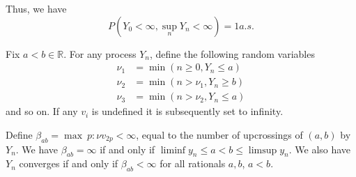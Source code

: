 \documentclass[10pt, oneside, reqno]{amsart}
\theoremstyle{plain}%
\theoremstyle{definition}
\theoremstyle{remark}
\newcommand{\R}{\mathbb{R}}
\begin{document}
Thus, we have \[
	P(Y_0 < \infty, \sup_{n} Y_n < \infty) = 1 a.s.
\]

Fix $a < b \in \R$.  For any process $Y_n$, define the following random variables \begin{align*}
	\nu_1 &= \min(n \geq 0, Y_n \leq a) \\
	\nu_2 &= \min(n > \nu_1, Y_n \geq b) \\
	\nu_3 &= \min(n > \nu_2, Y_n \leq a)
\end{align*} and so on.  If any $v_i$ is undefined it is subsequently set to infinity.

Define $\beta_{ab} = \max\ { p : \nu v_{2p} < \infty}$, equal to the number of upcrossings of $(a,b)$ by $Y_n$.  We have $\beta_{ab} = \infty$ if and only if $\liminf y_n \leq a < b \leq \limsup y_n$.  We also have $Y_n$ converges if and only if $\beta_{ab} < \infty$ for all rationals $a,b$, $a < b$.  
\end{document}
